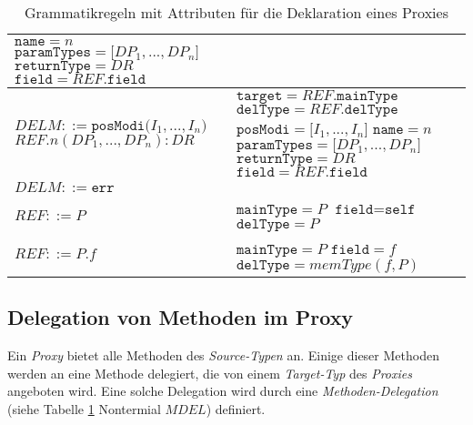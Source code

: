 \begin{table}[h!]
\begin{tabular}{|p{6cm}|p{10cm}|}
$\texttt{name} = \mathit{n}$\newline
$\texttt{paramTypes} = \mathit{[DP_1},...,\mathit{DP_n]}$\newline
$\texttt{returnType} = \mathit{DR}$\newline
$\texttt{field} = \mathit{REF}\texttt{.field}$
\\
\hline
$\mathit{DELM} ::=\texttt{posModi(} \mathit{I_1},...,\mathit{I_n} \texttt{)}$\newline
$\mathit{REF}\texttt{.}n(\mathit{DP_1},...,\mathit{DP_n}):DR $  
&
$\texttt{target} = \mathit{REF}.\texttt{mainType}$\newline
$\texttt{delType} = \mathit{REF}.\texttt{delType}$\newline
$\texttt{posModi} = \mathit{[I_1},...,\mathit{I_n]}$\newline
$\texttt{name} = \mathit{n}$\newline
$\texttt{paramTypes} = \mathit{[DP_1},...,\mathit{DP_n]}$\newline
$\texttt{returnType} = \mathit{DR}$\newline
$\texttt{field} = \mathit{REF}\texttt{.field}$
\\
\hline
$\mathit{DELM} ::= \texttt{err} $  
&
\\
\hline
$\mathit{REF} ::= \mathit{P}$
& 
$\texttt{mainType} = \mathit{P}$\newline
$\texttt{field} = \texttt{self}$\newline
$\texttt{delType} = \mathit{P}$
\\
\hline
$\mathit{REF} ::= \mathit{P}\texttt{.}\mathit{f}$
&
$\texttt{mainType} = \mathit{P}$\newline
$\texttt{field} = \mathit{f}$\newline
$\texttt{delType} = \mathit{memType(f,P)}$
\\
\hline
\end{tabular}
\caption{Grammatikregeln mit Attributen für die Deklaration eines Proxies}
 \label{tab:attrGrProxies}
\end{table}
\noindent
\subsection{Delegation von Methoden im Proxy}
Ein \emph{Proxy} bietet alle Methoden des \emph{Source-Typen} an. Einige dieser Methoden werden an eine Methode delegiert, die von einem \emph{Target-Typ} des \emph{Proxies} angeboten wird. Eine solche Delegation wird durch eine \emph{Methoden-Delegation} (siehe Tabelle \ref{tab:attrGrProxies} Nontermial $\mathit{MDEL}$) definiert.
